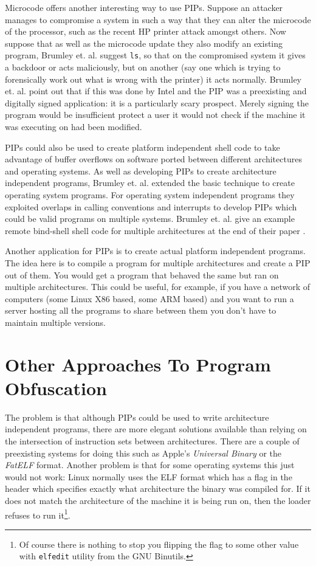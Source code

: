 \documentclass[10pt,]{book}
\begin{document}
Microcode offers another interesting way to use PIPs. Suppose an
attacker manages to compromise a system in such a way that they can
alter the microcode of the processor, such as the recent HP printer
attack amongst others\autocite{Cui:vx}\autocite{Scythale:tk}. Now
suppose that as well as the microcode update they also modify an
existing program, Brumley et. al. suggest \lstinline!ls!, so that on the
compromised system it gives a backdoor or acts maliciously, but on
another (say one which is trying to forensically work out what is wrong
with the printer) it acts normally. Brumley et. al. point
out\autocite{Cha:2010uh} that if this was done by Intel and the PIP was
a preexisting and digitally signed application: it is a particularly
scary prospect. Merely signing the program would be insufficient protect
a user it would not check if the machine it was executing on had been
modified.

PIPs could also be used to create platform independent shell code to
take advantage of buffer overflows on software ported between different
architectures and operating systems. As well as developing PIPs to
create architecture independent programs, Brumley et.
al.\autocite{Cha:2010uh} extended the basic technique to create
operating system programs. For operating system independent programs
they exploited overlaps in calling conventions and interrupts to develop
PIPs which could be valid programs on multiple systems. Brumley et. al.
give an example remote bind-shell shell code for multiple architectures
at the end of their paper \autocite{Cha:2010uh}.

Another application for PIPs is to create actual platform independent
programs. The idea here is to compile a program for multiple
architectures and create a PIP out of them. You would get a program that
behaved the same but ran on multiple architectures. This could be
useful, for example, if you have a network of computers (some Linux X86
based, some ARM based) and you want to run a server hosting all the
programs to share between them you don't have to maintain multiple
versions.

\section{Other Approaches To Program Obfuscation}

The problem is that although PIPs could be used to write architecture
independent programs, there are more elegant solutions available than
relying on the intersection of instruction sets between architectures.
There are a couple of preexisting systems for doing this such as Apple's
\emph{Universal Binary} or the \emph{FatELF}\autocite{Icculus:vl}
format. Another problem is that for some operating systems this just
would not work: Linux normally uses the ELF format\autocite{mancx:th}
which has a flag in the header which specifies exactly what architecture
the binary was compiled for. If it does not match the architecture of
the machine it is being run on, then the loader refuses to run
it\footnote{Of course there is nothing to stop you flipping the flag to
  some other value with \lstinline!elfedit! utility from the GNU
  Binutils.}.
\end{document}
